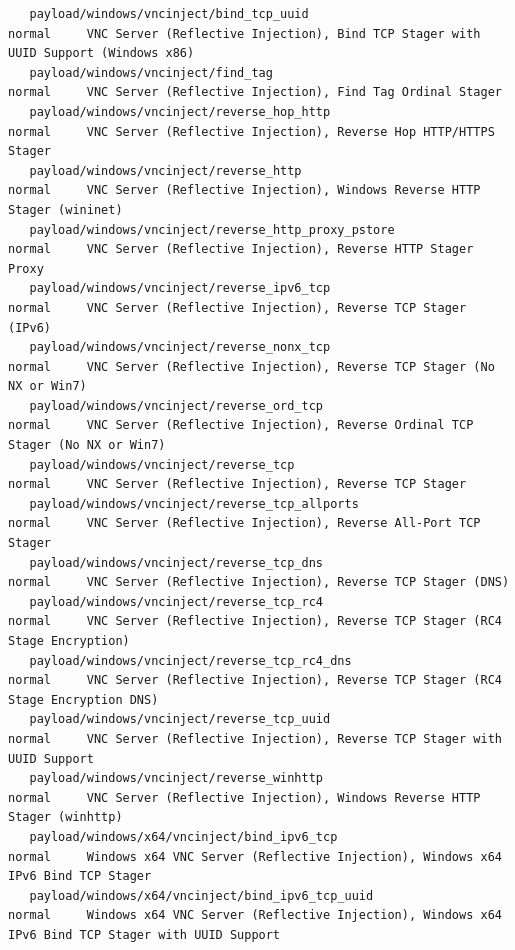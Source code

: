 \documentclass[10pt,a4paper]{report}
\begin{document}
\begin{lstlisting}
   payload/windows/vncinject/bind_tcp_uuid                               normal     VNC Server (Reflective Injection), Bind TCP Stager with UUID Support (Windows x86)
   payload/windows/vncinject/find_tag                                    normal     VNC Server (Reflective Injection), Find Tag Ordinal Stager
   payload/windows/vncinject/reverse_hop_http                            normal     VNC Server (Reflective Injection), Reverse Hop HTTP/HTTPS Stager
   payload/windows/vncinject/reverse_http                                normal     VNC Server (Reflective Injection), Windows Reverse HTTP Stager (wininet)
   payload/windows/vncinject/reverse_http_proxy_pstore                   normal     VNC Server (Reflective Injection), Reverse HTTP Stager Proxy
   payload/windows/vncinject/reverse_ipv6_tcp                            normal     VNC Server (Reflective Injection), Reverse TCP Stager (IPv6)
   payload/windows/vncinject/reverse_nonx_tcp                            normal     VNC Server (Reflective Injection), Reverse TCP Stager (No NX or Win7)
   payload/windows/vncinject/reverse_ord_tcp                             normal     VNC Server (Reflective Injection), Reverse Ordinal TCP Stager (No NX or Win7)
   payload/windows/vncinject/reverse_tcp                                 normal     VNC Server (Reflective Injection), Reverse TCP Stager
   payload/windows/vncinject/reverse_tcp_allports                        normal     VNC Server (Reflective Injection), Reverse All-Port TCP Stager
   payload/windows/vncinject/reverse_tcp_dns                             normal     VNC Server (Reflective Injection), Reverse TCP Stager (DNS)
   payload/windows/vncinject/reverse_tcp_rc4                             normal     VNC Server (Reflective Injection), Reverse TCP Stager (RC4 Stage Encryption)
   payload/windows/vncinject/reverse_tcp_rc4_dns                         normal     VNC Server (Reflective Injection), Reverse TCP Stager (RC4 Stage Encryption DNS)
   payload/windows/vncinject/reverse_tcp_uuid                            normal     VNC Server (Reflective Injection), Reverse TCP Stager with UUID Support
   payload/windows/vncinject/reverse_winhttp                             normal     VNC Server (Reflective Injection), Windows Reverse HTTP Stager (winhttp)
   payload/windows/x64/vncinject/bind_ipv6_tcp                           normal     Windows x64 VNC Server (Reflective Injection), Windows x64 IPv6 Bind TCP Stager
   payload/windows/x64/vncinject/bind_ipv6_tcp_uuid                      normal     Windows x64 VNC Server (Reflective Injection), Windows x64 IPv6 Bind TCP Stager with UUID Support

\end{lstlisting}
\end{document}
